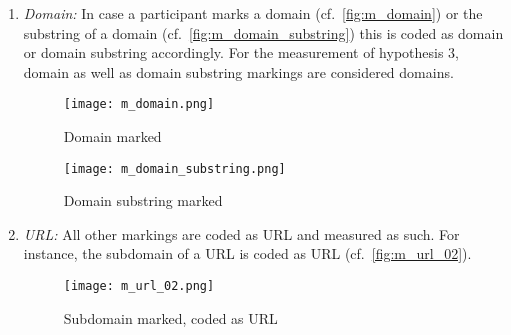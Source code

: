 \begin{enumerate}
	\item\textit{Domain:} In case a participant marks a domain (cf.~\autoref{fig:m_domain}) or the substring of a domain (cf.~\autoref{fig:m_domain_substring}) this is coded as domain or domain substring accordingly.
For the measurement of hypothesis 3, domain as well as domain substring markings are considered domains.
\begin{figure}[H]
\centering
\texttt{[image: m\_domain.png]}
\caption{Domain marked}
\label{fig:m_domain}
\end{figure}
\begin{figure}[H]
\centering
\texttt{[image: m\_domain\_substring.png]}
\caption{Domain substring marked}
\label{fig:m_domain_substring}
\end{figure}

	\item\textit{URL:} All other markings are coded as URL and measured as such. For instance, the subdomain of a URL is coded as URL (cf.~\autoref{fig:m_url_02}).
	\begin{figure}[H]
	\centering
	\texttt{[image: m\_url\_02.png]}
	\caption{Subdomain marked, coded as URL}
	\label{fig:m_url_02}
	\end{figure}
\end{enumerate}

